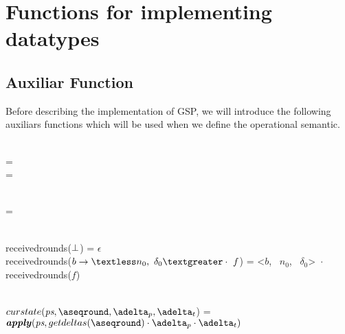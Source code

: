 
 
 \appendix
 
 \section{Functions for implementing datatypes}
 \subsection{Auxiliar Function}

Before describing the implementation of GSP, we will introduce the following auxiliars functions which will be used when we define the operational semantic.

\footnotesize
\ttfamily


\begin{flushleft}
 \\
\append{\gssegmentins{$\delta$}{\maxround}}{$\epsilon$} = \gssegmentins{$\delta$}{\maxround} \\
\append{\gssegmentins{$\delta$}{\maxround}}{$\headerround$:\tailround} =  
\end{flushleft}

\begin{flushleft}
 \\
 =  \gsprefixins{\applyplus{\state}{$\delta$ $\cdot$ $\epsilon$}}{\maxround[$\maxround'$]}  \\
\end{flushleft}

\begin{flushleft}
\\
receivedrounds($\perp$) = $\epsilon$ \\
receivedrounds($\partialfunction{b}{\textless n_0,\ \delta_0 \textgreater} \cdot\ f$) = \textless $b$, \ $n_0$, \ $\delta_0$\textgreater\ $\cdot$ receivedrounds($f$)
\end{flushleft}

\begin{flushleft}
 \\
$curstate(\state, \pending, \pushbuffer, \transactionbuffer$) = $\applyplus{\state}{getdeltas(\pending) \cdot\pushbuffer\cdot \transactionbuffer}$
\end{flushleft}


